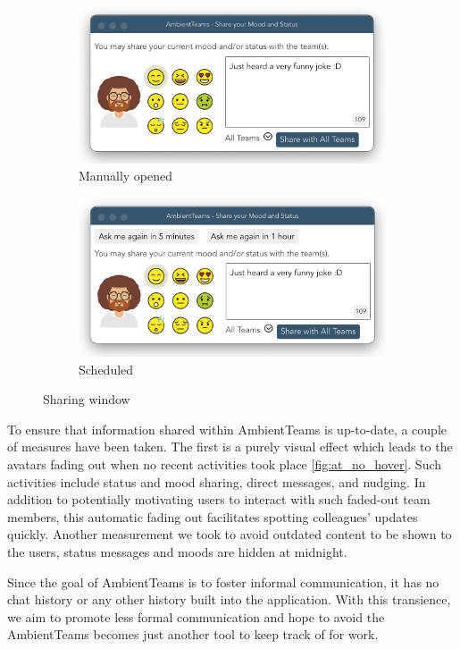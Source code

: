 \begin{figure}[h]
    \centering
    \begin{subfigure}{.5\textwidth}
        \centering
        \includegraphics[width=.8\linewidth]{./images/sharing_manual.png}
        \caption{Manually opened }
        \label{fig:sharing_manual}
    \end{subfigure}%
    \begin{subfigure}{.5\textwidth}
        \centering
        \includegraphics[width=.8\linewidth]{./images/sharing_auto.png}
        \caption{Scheduled }
        \label{fig:sharing_auto}
    \end{subfigure}
    \caption{Sharing window}
\end{figure}

To ensure that information shared within AmbientTeams is up-to-date, a couple of measures have been taken. The first is a purely visual effect which leads to the avatars fading out when no recent activities took place \autoref{fig:at_no_hover}. Such activities include status and mood sharing, direct messages, and nudging. In addition to potentially motivating users to interact with such faded-out team members, this automatic fading out facilitates spotting colleagues' updates quickly. Another measurement we took to avoid outdated content to be shown to the users, status messages and moods are hidden at midnight.

Since the goal of AmbientTeams is to foster informal communication, it has no chat history or any other history built into the application. With this transience, we aim to promote less formal communication and hope to avoid the AmbientTeams becomes just another tool to keep track of for work.

